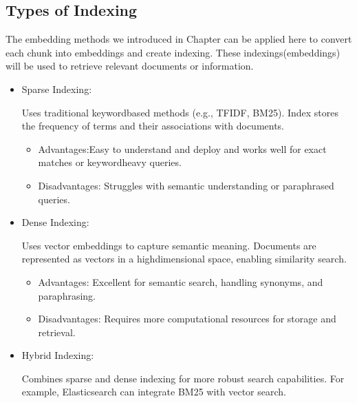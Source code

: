 \documentclass[letterpaper,11pt,english]{sphinxmanual}
\begin{document}
\subsection{Types of Indexing}
\label{\detokenize{rag:types-of-indexing}}
\sphinxAtStartPar
The embedding methods we introduced in Chapter {\hyperref[\detokenize{embedding:embedding}]{}} can be applied here to convert each chunk
into embeddings and create indexing. These indexings(embeddings) will be used to retrieve relevant documents or information.
\begin{itemize}
\item {} 
\sphinxAtStartPar
Sparse Indexing:

\sphinxAtStartPar
Uses traditional keyword\sphinxhyphen{}based methods (e.g., TF\sphinxhyphen{}IDF, BM25).
Index stores the frequency of terms and their associations with documents.
\begin{itemize}
\item {} 
\sphinxAtStartPar
Advantages:Easy to understand and deploy and works well for exact matches or keyword\sphinxhyphen{}heavy queries.

\item {} 
\sphinxAtStartPar
Disadvantages: Struggles with semantic understanding or paraphrased queries.

\end{itemize}

\item {} 
\sphinxAtStartPar
Dense Indexing:

\sphinxAtStartPar
Uses vector embeddings to capture semantic meaning. Documents are represented as vectors in a
high\sphinxhyphen{}dimensional space, enabling similarity search.
\begin{itemize}
\item {} 
\sphinxAtStartPar
Advantages: Excellent for semantic search, handling synonyms, and paraphrasing.

\item {} 
\sphinxAtStartPar
Disadvantages: Requires more computational resources for storage and retrieval.

\end{itemize}

\item {} 
\sphinxAtStartPar
Hybrid Indexing:

\sphinxAtStartPar
Combines sparse and dense indexing for more robust search capabilities. For example, Elasticsearch
can integrate BM25 with vector search.

\end{itemize}
\end{document}
